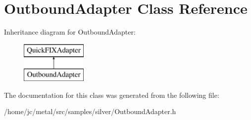 \hypertarget{classOutboundAdapter}{}\section{Outbound\+Adapter Class Reference}
\label{classOutboundAdapter}
Inheritance diagram for Outbound\+Adapter\+:\begin{figure}[H]
\begin{center}
\leavevmode
\includegraphics[height=2.000000cm]{classOutboundAdapter}
\end{center}
\end{figure}


The documentation for this class was generated from the following file\+:\begin{DoxyCompactItemize}
\item 
/home/jc/metal/src/samples/silver/Outbound\+Adapter.\+h\end{DoxyCompactItemize}
